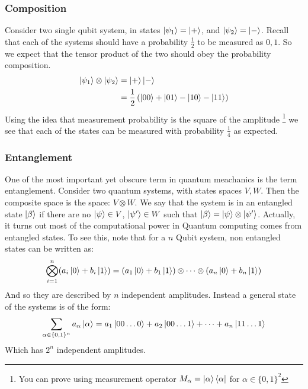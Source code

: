 \documentclass{beamer}
\begin{document}
    \begin{frame}
        \frametitle{Composition}
        \begin{example}
        Consider two single qubit system, in states $\ket{\psi_1} = \ket{+}$, and $\ket{\psi_2} =\ket{-}$.
        Recall that each of the systems should have a probability $\frac{1}{2}$ to be measured as $0, 1$. 
        So we expect that the tensor product of the two should obey the probability composition.
        \begin{align}
            \ket{\psi_1} \otimes \ket{\psi_2} &= \ket{+}\ket{-} \\
            &= \frac{1}{2}\left(\ket{00} + \ket{01} - \ket{10} - \ket{11} \right)
        \end{align}
        Using the idea that measurement probability is the square of the amplitude
        \footnote{You can prove using measurement operator $M_\alpha = \ket{\alpha}\bra{\alpha}$ for $\alpha \in \{0, 1\}^2$}
        we see that each of the states can be measured with probability $\frac{1}{4}$ as expected.
        \end{example}
    \end{frame}
    \begin{frame}
        \frametitle{Entanglement}
        One of the most important yet obscure term in quantum meachanics is the term entanglement.
        Consider two quantum systems, with states spaces $V, W$. Then the composite space is the space: $V \otimes W$.
        We say that the system is in an entangled state $\ket{\beta}$ if there are no $\ket{\psi} \in V$, $\ket{\psi'} \in W$
        such that $\ket{\beta} = \ket{\psi} \otimes \ket{\psi'}$. 
        Actually, it turns out most of the computational power in Quantum computing comes from entangled states.
        To see this, note that for a $n$ Qubit system, non entangled states can be written as:
        \begin{equation}
            \bigotimes_{i =1}^n (a_i \ket{0} + b_i \ket{1}) = (a_1 \ket{0} + b_1 \ket{1}) \otimes \dots \otimes (a_n \ket{0} + b_n \ket{1})
        \end{equation}
        And so they are described by $n$ independent amplitudes. Instead a general state of the systems is of the form:
        \begin{equation}
            \sum_{\alpha \in \{0,1\}^n} a_\alpha \ket{\alpha} =  a_1 \ket{00\dots0} + a_2 \ket{00\dots1} + \dots + a_n \ket{11\dots1}
        \end{equation}
        Which has $2^n$ independent amplitudes.
    \end{frame}
\end{document}
